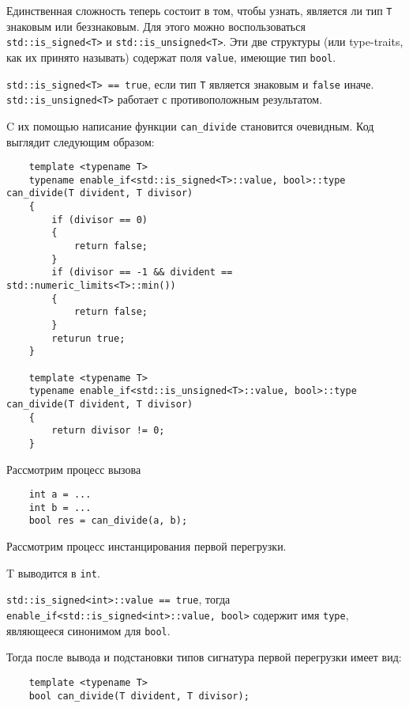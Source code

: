 	Единственная сложность теперь состоит в том, чтобы узнать, является ли тип \texttt{T} знаковым или беззнаковым. Для этого можно воспользоваться \texttt{std::is_signed<T>} и \texttt{std::is_unsigned<T>}. Эти две структуры (или type-traits, как их принято называть) содержат поля \texttt{value}, имеющие тип \texttt{bool}.
	
	\texttt{std::is_signed<T> == true}, если тип \texttt{T} является знаковым и \texttt{false} иначе. \texttt{std::is_unsigned<T>} работает с противоположным результатом.
	
	C их помощью написание функции \texttt{can_divide} становится очевидным. Код выглядит следующим образом:
	
	\begin{verbatim}
	template <typename T>
	typename enable_if<std::is_signed<T>::value, bool>::type can_divide(T divident, T divisor)
	{
		if (divisor == 0)
		{
			return false;
		}		
		if (divisor == -1 && divident == std::numeric_limits<T>::min())
		{
			return false;
		}
		returun true;
	}
	
	template <typename T>
	typename enable_if<std::is_unsigned<T>::value, bool>::type can_divide(T divident, T divisor)
	{
		return divisor != 0;
	}
	\end{verbatim}
	
	Рассмотрим процесс вызова
	
	\begin{verbatim}
	int a = ...
	int b = ...
	bool res = can_divide(a, b);
	\end{verbatim}
	
	Рассмотрим процесс инстанцирования первой перегрузки.
	
	T выводится в \texttt{int}.
	
	\texttt{std::is_signed<int>::value == true}, тогда \texttt{enable_if<std::is_signed<int>::value, bool>} содержит имя \texttt{type}, являющееся синонимом для \texttt{bool}.
	
	Тогда после вывода и подстановки типов сигнатура первой перегрузки имеет вид:
	
	\begin{verbatim}
	template <typename T>
	bool can_divide(T divident, T divisor);
	\end{verbatim}
	
